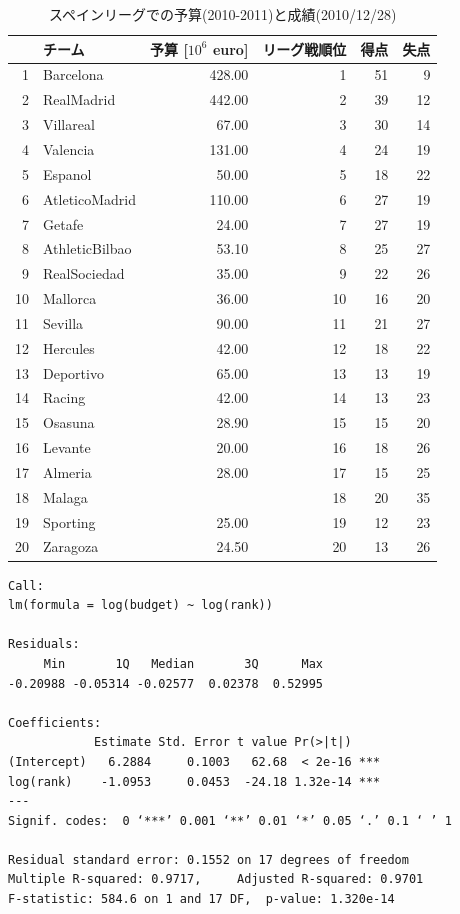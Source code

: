 \begin{table}[!htbp]
\begin{center}
\begin{tabular}{rlrrrr} \hline
& チーム & 予算 [$10^6$ euro] & リーグ戦順位 & 得点 & 失点 \\ \hline
1 & Barcelona & 428.00 &   1 &  51 &   9 \\ 
2 & RealMadrid & 442.00 &   2 &  39 &  12 \\ 
3 & Villareal & 67.00 &   3 &  30 &  14 \\ 
4 & Valencia & 131.00 &   4 &  24 &  19 \\ 
5 & Espanol & 50.00 &   5 &  18 &  22 \\ 
6 & AtleticoMadrid & 110.00 &   6 &  27 &  19 \\ 
7 & Getafe & 24.00 &   7 &  27 &  19 \\ 
8 & AthleticBilbao & 53.10 &   8 &  25 &  27 \\ 
9 & RealSociedad & 35.00 &   9 &  22 &  26 \\ 
10 & Mallorca & 36.00 &  10 &  16 &  20 \\ 
11 & Sevilla & 90.00 &  11 &  21 &  27 \\ 
12 & Hercules & 42.00 &  12 &  18 &  22 \\ 
13 & Deportivo & 65.00 &  13 &  13 &  19 \\ 
14 & Racing & 42.00 &  14 &  13 &  23 \\ 
15 & Osasuna & 28.90 &  15 &  15 &  20 \\ 
16 & Levante & 20.00 &  16 &  18 &  26 \\ 
17 & Almeria & 28.00 &  17 &  15 &  25 \\
18 & Malaga &  &  18 &  20 &  35 \\ 
19 & Sporting & 25.00 &  19 &  12 &  23 \\ 
20 & Zaragoza & 24.50 &  20 &  13 &  26 \\ \hline
\end{tabular}
\caption{スペインリーグでの予算(2010-2011)と成績(2010/12/28)}
\label{tab:スペインリーグでの予算}
\end{center}
\end{table}

\begin{lstlisting}[caption=予算額と予算順位, label=code:予算額と予算順位]
Call:
lm(formula = log(budget) ~ log(rank))

Residuals:
     Min       1Q   Median       3Q      Max 
-0.20988 -0.05314 -0.02577  0.02378  0.52995 

Coefficients:
            Estimate Std. Error t value Pr(>|t|)    
(Intercept)   6.2884     0.1003   62.68  < 2e-16 ***
log(rank)    -1.0953     0.0453  -24.18 1.32e-14 ***
---
Signif. codes:  0 ‘***’ 0.001 ‘**’ 0.01 ‘*’ 0.05 ‘.’ 0.1 ‘ ’ 1 

Residual standard error: 0.1552 on 17 degrees of freedom
Multiple R-squared: 0.9717,     Adjusted R-squared: 0.9701 
F-statistic: 584.6 on 1 and 17 DF,  p-value: 1.320e-14
\end{lstlisting}

